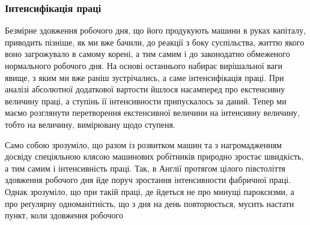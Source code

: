 \subsubsection[Інтенсифікація праці]{Інтенсифікація праці \footnotemarkZ{}}

\noindent{}Безмірне здовження робочого дня, що його продукують машини
в руках капіталу, приводить пізніше, як ми вже бачили, до
реакції з боку суспільства, життю якого воно загрожувало в
самому корені, а тим самим і до законодатно обмеженого нормального
робочого дня. На основі останнього набирає вирішальної
ваги явище, з яким ми вже раніш зустрічались, а саме інтенсифікація
праці. При аналізі абсолютної додаткової вартости йшлося
насамперед про екстенсивну величину праці, а ступінь її інтенсивности
припускалось за даний. Тепер ми маємо розглянути
перетворення екстенсивної величини на інтенсивну величину,
тобто на величину, вимірювану щодо ступеня.

Само собою зрозуміло, що разом із розвитком машин та з нагромадженням
досвіду спеціяльною клясою машинових робітників
природно зростає швидкість, а тим самим і інтенсивність
праці. Так, в Англії протягом цілого півстоліття здовження
робочого дня йде поруч зростання інтенсивности фабричної праці.
Однак зрозуміло, що при такій праці, де йдеться не про минущі
пароксизми, а про реґулярну одноманітність, що з дня на день
повторюється, мусить настати пункт, коли здовження робочого
\parbreak{}  %
